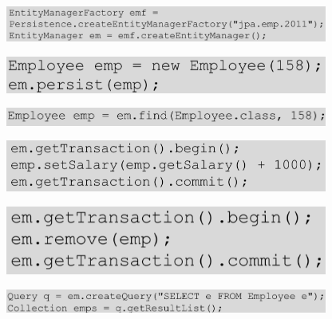\documentclass{report}
\newenvironment{Figure}
	{\par\medskip\noindent\minipage{\linewidth}}
	{\endminipage\par\medskip}
\theoremstyle{definition}
\theoremstyle{example}
\begin{document}
\begin{Figure}
\centering
\includegraphics[width=400px]{img/emErstellen.png}
	\label{fig:Entity Manager erstellen}
\end{Figure}

\begin{Figure}
\centering
\includegraphics[width=400px]{img/EntityPersist.png}
	\label{fig:Entity persistieren}
\end{Figure}

\begin{Figure}
\centering
\includegraphics[width=400px]{img/EntitySearch.png}
	\label{fig:Entity suchen}
\end{Figure}

\begin{Figure}
\centering
\includegraphics[width=400px]{img/EntityGetSet.png}
	\label{fig:Entity verändern}
\end{Figure}

\begin{Figure}
\centering
\includegraphics[width=400px]{img/EntityDelete.png}
	\label{fig:Entity löschen}
\end{Figure}

\begin{Figure}
\centering
\includegraphics[width=400px]{img/EntityQuery.png}
	\label{fig:Entity abfragen}
\end{Figure}
\end{document}
